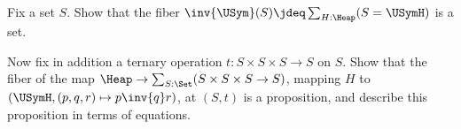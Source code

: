 \begin{exercise}\label{xca:heap-variety}
  Fix a set $S$.
  Show that the fiber $\inv{\USym}(S)\jdeq\sum_{H:\Heap}(S=\USymH)$ is a set.

  Now fix in addition a ternary operation $t:S\times S\times S\to S$ on $S$.
  Show that the fiber of the map $\Heap \to \sum_{S:\Set}(S\times S\times S \to S)$,
  mapping $H$ to $(\USymH,(p,q,r)\mapsto p \inv{q} r)$,
  at $(S,t)$ is a proposition,
  and describe this proposition in terms of equations.
\end{exercise}




